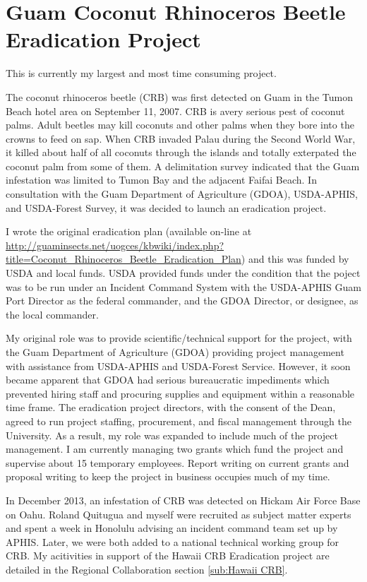 \documentclass[12pt,oneside,english]{scrbook}
\begin{document}
\section{Guam Coconut Rhinoceros Beetle Eradication Project}

This is currently my largest and most time consuming project. 

The coconut rhinoceros beetle (CRB) was first detected on Guam in
the Tumon Beach hotel area on September 11, 2007. CRB is avery serious
pest of coconut palms. Adult beetles may kill coconuts and other palms
when they bore into the crowns to feed on sap. When CRB invaded Palau
during the Second World War, it killed about half of all coconuts
through the islands and totally exterpated the coconut palm from some
of them. A delimitation survey indicated that the Guam infestation
was limited to Tumon Bay and the adjacent Faifai Beach. In consultation
with the Guam Department of Agriculture (GDOA), USDA-APHIS, and USDA-Forest
Survey, it was decided to launch an eradication project. 

I wrote the original eradication plan (available on-line at \url{http://guaminsects.net/uogces/kbwiki/index.php?title=Coconut_Rhinoceros_Beetle_Eradication_Plan})
and this was funded by USDA and local funds. USDA provided funds under
the condition that the poject was to be run under an Incident Command
System with the USDA-APHIS Guam Port Director as the federal commander,
and the GDOA Director, or designee, as the local commander.

My original role was to provide scientific/technical support for the
project, with the Guam Department of Agriculture (GDOA) providing
project management with assistance from USDA-APHIS and USDA-Forest
Service. However, it soon became apparent that GDOA had serious bureaucratic
impediments which prevented hiring staff and procuring supplies and
equipment within a reasonable time frame. The eradication project
directors, with the consent of the Dean, agreed to run project staffing,
procurement, and fiscal management through the University. As a result,
my role was expanded to include much of the project management. I
am currently managing two grants which fund the project and supervise
about 15 temporary employees. Report writing on current grants and
proposal writing to keep the project in business occupies much of
my time. 

In December 2013, an infestation of CRB was detected on Hickam Air
Force Base on Oahu. Roland Quitugua and myself were recruited as subject
matter experts and spent a week in Honolulu advising an incident command
team set up by APHIS. Later, we were both added to a national technical
working group for CRB. My acitivities in support of the Hawaii CRB
Eradication project are detailed in the Regional Collaboration section
\ref{sub:Hawaii CRB}. 
\end{document}
